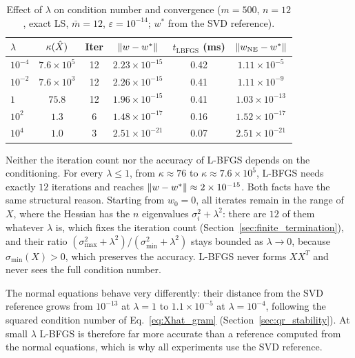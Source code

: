 \begin{table}[H]
\centering
\caption{Effect of $\lambda$ on condition number and convergence
  ($m = 500$, $n = 12$, exact LS, $\bar{m} = 12$, $\varepsilon = 10^{-14}$;
  $w^*$ from the SVD reference).}
\label{tab:lambda_effect}
\small
\setlength{\tabcolsep}{8pt}
\begin{tabular}{lccccc}
    \toprule
    $\lambda$ & $\kappa(\hat{X})$ & \textbf{Iter}
      & $\left\|w - w^*\right\|$ & $t_{\mathrm{LBFGS}}$ (ms)
      & $\left\|w_{\mathrm{NE}} - w^*\right\|$ \\
    \midrule
    $10^{-4}$ & $7.6 \times 10^{5}$ & 12 & $2.23 \times 10^{-15}$ & 0.42 & $1.11 \times 10^{-5}$  \\
    $10^{-2}$ & $7.6 \times 10^{3}$ & 12 & $2.26 \times 10^{-15}$ & 0.41 & $1.11 \times 10^{-9}$  \\
    $1$       & $75.8$              & 12 & $1.96 \times 10^{-15}$ & 0.41 & $1.03 \times 10^{-13}$ \\
    $10^{2}$  & $1.3$               &  6 & $1.48 \times 10^{-17}$ & 0.16 & $1.52 \times 10^{-17}$ \\
    $10^{4}$  & $1.0$               &  3 & $2.51 \times 10^{-21}$ & 0.07 & $2.51 \times 10^{-21}$ \\
    \bottomrule
\end{tabular}
\end{table}

\noindent Neither the iteration count nor the accuracy of L-BFGS depends on the
conditioning. For every $\lambda \leq 1$, from $\kappa \approx 76$ to
$\kappa \approx 7.6 \times 10^5$, L-BFGS needs exactly $12$ iterations and
reaches $\left\|w - w^*\right\| \approx 2 \times 10^{-15}$. Both facts have the same
structural reason. Starting from $w_0 = 0$, all iterates remain in the range
of $X$, where the Hessian has the $n$ eigenvalues $\sigma_i^2 + \lambda^2$:
there are $12$ of them whatever $\lambda$ is, which fixes the iteration count
(Section~\ref{sec:finite_termination}), and their ratio
$(\sigma_{\max}^2+\lambda^2)/(\sigma_{\min}^2+\lambda^2)$ stays bounded as
$\lambda \to 0$, because $\sigma_{\min}(X) > 0$, which preserves the
accuracy. L-BFGS never forms $XX^T$ and never sees the full condition number.

\noindent The normal equations behave very differently: their distance from the
SVD reference grows from $10^{-13}$ at $\lambda = 1$ to $1.1 \times 10^{-5}$
at $\lambda = 10^{-4}$, following the squared condition number of
Eq.~\eqref{eq:Xhat_gram} (Section~\ref{sec:qr_stability}). At small $\lambda$
L-BFGS is therefore far more accurate than a reference computed from the
normal equations, which is why all experiments use the SVD reference.

